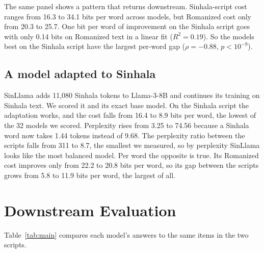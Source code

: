 \documentclass[3p,times,procedia]{elsarticle}
\begin{document}
The same panel shows a pattern that returns downstream. Sinhala-script cost ranges from 16.3 to 34.1 bits per word across models, but Romanized cost only from 20.3 to 25.7. One bit per word of improvement on the Sinhala script goes with only 0.14 bits on Romanized text in a linear fit ($R^2 = 0.19$). So the models best on the Sinhala script have the largest per-word gap ($\rho = -0.88$, $p < 10^{-9}$).

\subsection{A model adapted to Sinhala}
\label{sec:sinllama}

SinLlama \cite{sinllama} adds 11{,}080 Sinhala tokens to Llama-3-8B and continues its training on Sinhala text. We scored it and its exact base model. On the Sinhala script the adaptation works, and the cost falls from 16.4 to 8.9 bits per word, the lowest of the 32 models we scored. Perplexity rises from 3.25 to 74.56 because a Sinhala word now takes 1.44 tokens instead of 9.68. The perplexity ratio between the scripts falls from 311 to 8.7, the smallest we measured, so by perplexity SinLlama looks like the most balanced model. Per word the opposite is true. Its Romanized cost improves only from 22.2 to 20.8 bits per word, so its gap between the scripts grows from 5.8 to 11.9 bits per word, the largest of all.

\section{Downstream Evaluation}
\label{sec:extrinsic}

Table~\ref{tab:main} compares each model's answers to the same items in the two scripts.
\end{document}
